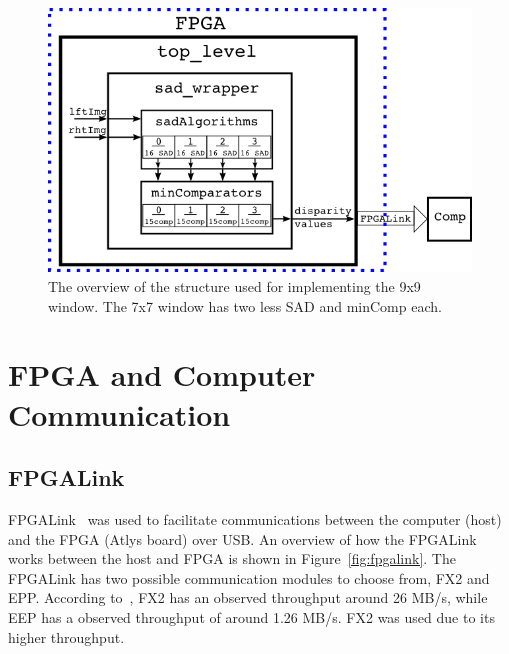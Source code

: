\begin{figure}[h]
	\begin{center}
		\includegraphics[width=150mm]{figures/top_level_rtl.png}
		\captionfonts
		\caption{The overview of the structure used for implementing the 9x9 window. The 7x7 window has two less SAD and minComp each.}
		\label{fig:topLevel_rtl}
	\end{center}
\end{figure}

\section{FPGA and Computer Communication}

\subsection{FPGALink}
\label{sec:fpgalink}

FPGALink~\cite{fpgalink} was used to facilitate communications between the computer (host) and the FPGA (Atlys board) over USB. An overview of how the FPGALink works between the host and FPGA is shown in Figure~\ref{fig:fpgalink}. The FPGALink has two possible communication modules to choose from, FX2 and EPP. According to~\cite{fpgalink}, FX2 has an observed throughput around 26 MB/s, while EEP has a observed throughput of around 1.26 MB/s. FX2 was used due to its higher throughput.

